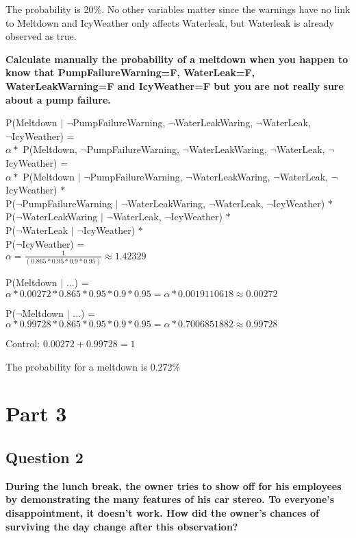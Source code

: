 \documentclass[12pt,a4paper]{article}
\begin{document}
The probability is 20\%. No other variables matter since the warnings have no link to Meltdown and IcyWeather only affects Waterleak, but Waterleak is already observed as true. 

\textbf{Calculate manually the probability of a meltdown when you happen to know that PumpFailureWarning=F, WaterLeak=F, WaterLeakWarning=F and IcyWeather=F but you are not really sure about a pump failure.}

P(Meltdown $|$ $\lnot$PumpFailureWarning, $\lnot$WaterLeakWaring, $\lnot$WaterLeak, \\ $\lnot$IcyWeather) = \\
$\alpha *$ P(Meltdown, $\lnot$PumpFailureWarning, $\lnot$WaterLeakWaring, $\lnot$WaterLeak, $\lnot$IcyWeather) = \\
$\alpha *$ P(Meltdown $|$ $\lnot$PumpFailureWarning, $\lnot$WaterLeakWaring, $\lnot$WaterLeak, $\lnot$IcyWeather) $*$ \\ P($\lnot$PumpFailureWarning $|$ $\lnot$WaterLeakWaring, $\lnot$WaterLeak, $\lnot$IcyWeather) $*$ \\ P($\lnot$WaterLeakWaring $|$ $\lnot$WaterLeak, $\lnot$IcyWeather) $*$ \\ P($\lnot$WaterLeak $|$ $\lnot$IcyWeather) $*$ \\ P($\lnot$IcyWeather) = \\ 

$\alpha = \frac{1}{(0.865 * 0.95 * 0.9 * 0.95)} \approx 1.42329$

P(Meltdown $|$ ...) = $\alpha * 0.00272 * 0.865 * 0.95 * 0.9 * 0.95 = \alpha * 0.0019110618 \approx 0.00272$

P($\lnot$Meltdown $|$ ...) = $\alpha * 0.99728 * 0.865 * 0.95 * 0.9 * 0.95 = \alpha * 0.7006851882 \approx 0.99728$ 

Control: $0.00272 + 0.99728 = 1$ %

The probability for a meltdown is 0.272\%

\section {Part 3}
\subsection{Question 2}
\textbf{During the lunch break, the owner tries to show off for his employees by demonstrating the many features of his car stereo. To everyone's disappointment, it doesn't work. How did the owner's chances of surviving the day change after this observation?}
\end{document}
